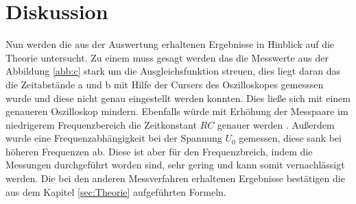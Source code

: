 \section{Diskussion}
\label{sec:Diskussion}
Nun werden die aus der Auswertung erhaltenen
Ergebnisse in Hinblick auf die Theorie untersucht.
Zu einem muss gesagt werden das die Messwerte aus der Abbildung \ref{abb:c} stark
um die Ausgleichsfunktion streuen, dies liegt daran das die Zeitabstände a und b mit
Hilfe der Cursers des Oszilloskopes gemesssen wurde und diese nicht genau eingestellt werden konnten.
Dies ließe sich mit einem genaueren Oszilloskop mindern.
Ebenfalls würde mit Erhöhung der Messpaare im niedrigerem Frequenzbereich die Zeitkonstant $RC$ genauer werden .
Außerdem wurde eine Frequenzabhängigkeit bei der Spannung $U_0$ gemessen, diese sank bei höheren Frequenzen ab.
Diese ist aber für den Frequenzbreich, indem die Messungen durchgeführt
worden sind, sehr gering und kann somit vernachlässigt werden.
Die bei den anderen Messverfahren erhaltenen Ergebnisse bestätigen
die aus dem Kapitel \ref{sec:Theorie} aufgeführten Formeln. 

